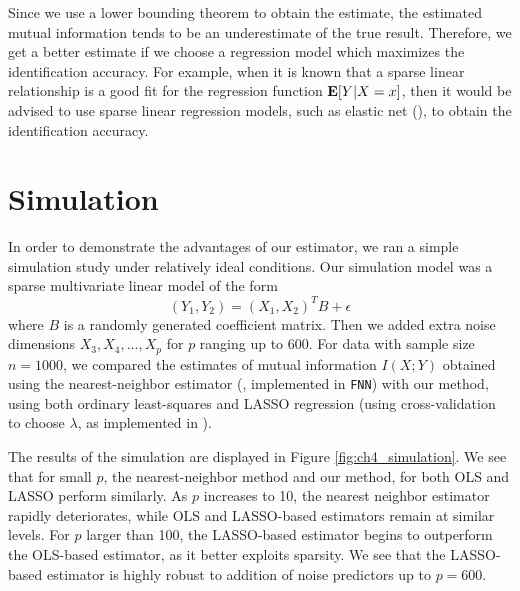 Since we use a lower bounding theorem to obtain the estimate, the
estimated mutual information tends to be an underestimate of the true
result.  Therefore, we get a better estimate if we choose a regression
model which maximizes the identification accuracy.  For example, when
it is known that a sparse linear relationship is a good fit for the
regression function $\textbf{E}[Y|X = x]$, then it would be advised to use
sparse linear regression models, such as elastic net (\cite{Zou2005}),
to obtain the identification accuracy.

\section{Simulation}\label{sec:ch4_simulation}

In order to demonstrate the advantages of our estimator, we ran a simple simulation study under relatively ideal conditions.
Our simulation model was a sparse multivariate linear model of the form
\[
(Y_1, Y_2) = (X_1, X_2)^T B + \epsilon
\]
where $B$ is a randomly generated coefficient matrix.  Then we added
extra noise dimensions $X_3, X_4, \hdots, X_p$ for $p$ ranging up to
600.  For data with sample size $n = 1000$, we compared the estimates
of mutual information $I(X; Y)$ obtained using the nearest-neighbor
estimator (\cite{Mnatsakanov2008}, implemented in {\tt FNN}) with our
method, using both ordinary least-squares and LASSO regression (using
cross-validation to choose $\lambda$, as implemented in \cite{glmnet}).

The results of the simulation are displayed in Figure
\ref{fig:ch4_simulation}.  We see that for small $p$, the
nearest-neighbor method and our method, for both OLS and LASSO perform
similarly.  As $p$ increases to 10, the nearest neighbor estimator
rapidly deteriorates, while OLS and LASSO-based estimators remain at
similar levels.  For $p$ larger than 100, the LASSO-based estimator
begins to outperform the OLS-based estimator, as it better exploits
sparsity.  We see that the LASSO-based estimator is highly robust to
addition of noise predictors up to $p = 600$.

